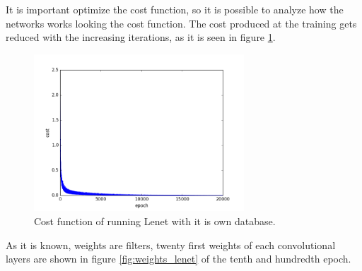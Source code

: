 It is important optimize the cost function, so it is possible to analyze how the networks works looking the cost function. The cost produced at the training gets reduced with the increasing iterations, as it is seen in figure \ref{fig:Lenetcost}.\\

\begin{figure}[htb]
\centering
\includegraphics[width=0.7\textwidth]{images/images_lenet/cost_lenet.png}
\caption{Cost function of running Lenet with it is own database.} \label{fig:Lenetcost}
\end{figure}

As it is known, weights are filters, twenty first weights of each convolutional layers are shown in figure \ref{fig:weights_lenet} of the tenth and hundredth epoch.\\


